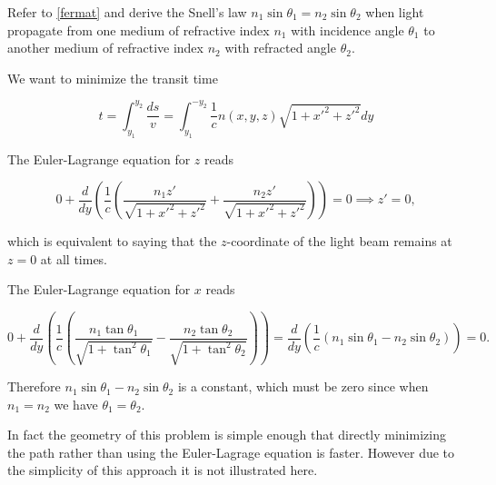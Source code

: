 \documentclass[a4paper,12pt]{report}
\begin{document}
{Refer to \cref{fermat} and derive the Snell's law \(n_1 \sin \theta _{1} = n_2 \sin \theta _{2}  \) when light propagate from one medium of refractive index \(n_1 \) with incidence angle \(\theta _{1} \) to another medium of refractive index \(n_2 \) with refracted angle \(\theta _{2} \).}
{We want to minimize the transit time 

\begin{equation}
	t = \int_{y_1 }^{y_2 } \frac{ds}{v} = \int_{y_1 }^{-y_2 } \frac{1}{c} n(x,y,z) \sqrt{1+x'^2+z'^2}dy      
\end{equation}

The Euler-Lagrange equation for \(z\) reads

\begin{equation}
	0 + \frac{d}{dy} \left( \frac{1}{c} \left( \frac{n_1 z'}{\sqrt{1+x'^2+z'^2} } + \frac{n_2 z'}{\sqrt{1+x'^2+z'^2} }  \right)  \right) = 0 \implies z' = 0, 
\end{equation}

which is equivalent to saying that the \(z\)-coordinate of the light beam remains at \(z = 0\) at all times.

The Euler-Lagrange equation for \(x\) reads

\begin{equation}
	0 + \frac{d}{dy} \left( \frac{1}{c} \left( \frac{n_1 \tan \theta _{1} }{\sqrt{1+\tan ^2\theta _{1} } } - \frac{n_2 \tan \theta _{2} }{\sqrt{1+\tan ^2\theta _{2} } }  \right)  \right) = \frac{d}{dy} \left( \frac{1}{c} \left( n_1 \sin \theta _{1} - n_2 \sin \theta _{2}   \right)  \right) = 0.  
\end{equation}

Therefore \(n_1 \sin \theta _{1} - n_2 \sin \theta _{2}  \)  is a constant, which must be zero since when \(n_1 = n_2 \) we have \(\theta _{1} = \theta _{2}  \). 

In fact the geometry of this problem is simple enough that directly minimizing the path rather than using the Euler-Lagrage equation is faster. However due to the simplicity of this approach it is not illustrated here.
} 

\end{document}
